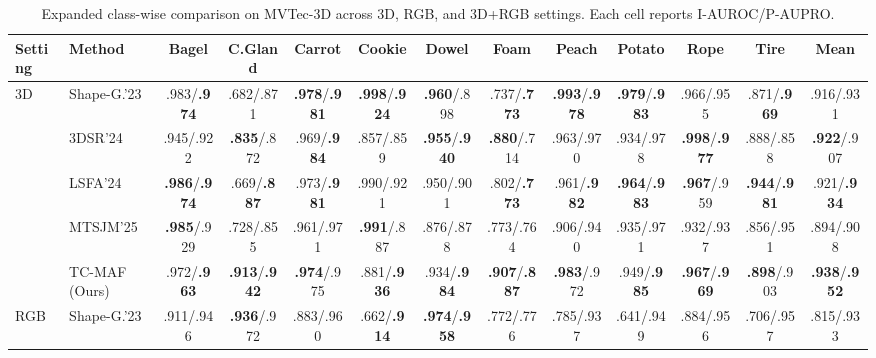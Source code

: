 \newcommand{\best}[1]{\textcolor{bestred}{\textbf{#1}}}
\newcommand{\second}[1]{\textcolor{secondblue}{\textbf{#1}}}

\begin{table}[!htbp]
  \centering
  \caption{Expanded class-wise comparison on MVTec-3D across 3D, RGB, and 3D+RGB settings. Each cell reports I-AUROC/P-AUPRO.}
  \label{tab:classwise-comparison}
  \small
  \setlength{\tabcolsep}{2pt}
  \renewcommand{\arraystretch}{1.02}
  \begin{tabular}{@{}llccccccccccc@{}}
    \toprule
    Setting & Method & Bagel & C.Gland & Carrot & Cookie & Dowel & Foam & Peach & Potato & Rope & Tire & Mean \\
    \midrule
    \multirow{5}{*}{3D}
    & Shape-G.'23~\cite{chu2023shapeguided} & .983/\best{.974} & .682/.871 & \best{.978}/\second{.981} & \best{.998}/\second{.924} & \best{.960}/.898 & .737/\second{.773} & \best{.993}/\second{.978} & \best{.979}/\second{.983} & .966/.955 & .871/\second{.969} & .916/.931 \\
    & 3DSR'24~\cite{zavrtanik2024cheating} & .945/.922 & \second{.835}/.872 & .969/\best{.984} & .857/.859 & \second{.955}/\second{.940} & \second{.880}/.714 & .963/.970 & .934/.978 & \best{.998}/\best{.977} & .888/.858 & \second{.922}/.907 \\
    & LSFA'24~\cite{tu2024lsfa} & \best{.986}/\best{.974} & .669/\second{.887} & .973/\second{.981} & .990/.921 & .950/.901 & .802/\second{.773} & .961/\best{.982} & \second{.964}/\second{.983} & \second{.967}/.959 & \best{.944}/\best{.981} & .921/\second{.934} \\
    & MTSJM'25~\cite{liu2025multimodal} & \second{.985}/.929 & .728/.855 & .961/.971 & \second{.991}/.887 & .876/.878 & .773/.764 & .906/.940 & .935/.971 & .932/.937 & .856/.951 & .894/.908 \\
    & TC-MAF (Ours) & .972/\second{.963} & \best{.913}/\best{.942} & \second{.974}/.975 & .881/\best{.936} & .934/\best{.984} & \best{.907}/\best{.887} & \second{.983}/.972 & .949/\best{.985} & \second{.967}/\second{.969} & \second{.898}/.903 & \best{.938}/\best{.952} \\
    \midrule
    \multirow{5}{*}{RGB}
    & Shape-G.'23~\cite{chu2023shapeguided} & .911/.946 & \second{.936}/.972 & .883/.960 & .662/\best{.914} & \second{.974}/\second{.958} & .772/.776 & .785/.937 & .641/.949 & .884/.956 & .706/.957 & .815/.933 \\

\end{tabular}
\end{table}
